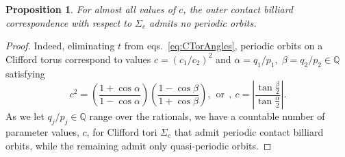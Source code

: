 \documentclass{article}
\newcommand{\Q}{\mathbb{Q}} %
\newtheorem{prop}{Proposition}[section]
\begin{document}
\begin{prop}
For almost all values of $c$, the outer contact billiard correspondence with respect to $\Sigma_c$ admits no periodic orbits.
\end{prop}

\begin{proof}
Indeed, eliminating $t$ from eqs.~\eqref{eq:CTorAngles}, periodic orbits on a Clifford torus  
correspond to values $c = (c_1/c_2)^2$ and $\alpha = q_1/p_1, \; \beta =q_2/p_2\in \Q$ satisfying
    \[ c^2 = \left( \frac{1 + \cos\alpha}{1-\cos\alpha}\right)\left( \frac{1 - \cos\beta}{1+\cos\beta}\right), 
    ~~\text{or}~~,~ 
    c = \left|\dfrac{\tan\frac{\beta}{2}}{\tan \frac{\alpha}{2}}\right|.\]
As we let $q_j/p_j\in \Q$ range over the rationals, we have a countable 
number of parameter values, $c$, for Clifford tori $\Sigma_c$ that admit periodic contact billiard orbits, while the remaining 
admit only quasi-periodic orbits.
\end{proof}
\end{document}
